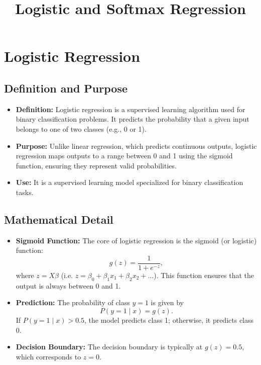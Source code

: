 \documentclass[10pt]{article}
\title{Logistic and Softmax Regression}
\author{}
\date{}
\begin{document}
\maketitle

\section{Logistic Regression}

\subsection{Definition and Purpose}
\begin{itemize}
    \item \textbf{Definition:} Logistic regression is a supervised learning algorithm used for binary classification problems. It predicts the probability that a given input belongs to one of two classes (e.g., 0 or 1).
    \item \textbf{Purpose:} Unlike linear regression, which predicts continuous outputs, logistic regression maps outputs to a range between 0 and 1 using the sigmoid function, ensuring they represent valid probabilities.
    \item \textbf{Use:} It is a supervised learning model specialized for binary classification tasks.
\end{itemize}

\subsection{Mathematical Detail}
\begin{itemize}
    \item \textbf{Sigmoid Function:} The core of logistic regression is the sigmoid (or logistic) function:
    \[
    g(z)=\frac{1}{1+e^{-z}},
    \]
    where \(z=X\beta\) (i.e. \(z = \beta_0 + \beta_1 x_1 + \beta_2 x_2 + \ldots\)). This function ensures that the output is always between 0 and 1.
    \item \textbf{Prediction:} The probability of class \( y = 1 \) is given by 
    \[
    P(y=1 \mid x)=g(z).
    \]
    If \(P(y=1 \mid x) > 0.5\), the model predicts class 1; otherwise, it predicts class 0.
    \item \textbf{Decision Boundary:} The decision boundary is typically at \( g(z)=0.5 \), which corresponds to \(z=0\).
\end{itemize}
\end{document}
